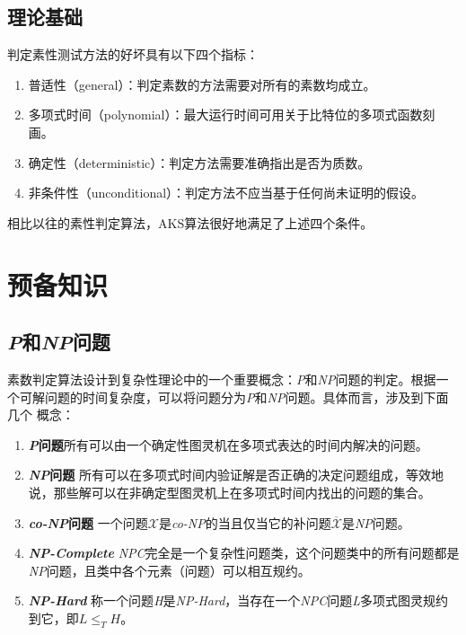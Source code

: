 \documentclass[a4paper]{article}
\numberwithin{equation}{section}
\begin{document}
\begin{multicols}{2}
  \subsection{理论基础}
  判定素性测试方法的好坏具有以下四个指标：
  \begin{enumerate}
    \item 普适性（general）：判定素数的方法需要对所有的素数均成立。
    \item 多项式时间（polynomial）：最大运行时间可用关于比特位的多项式函数刻画。
    \item 确定性（deterministic）：判定方法需要准确指出是否为质数。
    \item 非条件性（unconditional）：判定方法不应当基于任何尚未证明的假设。
  \end{enumerate}

  相比以往的素性判定算法，AKS算法很好地满足了上述四个条件。

  \section{预备知识}    
  \subsection{\textit{P}和\textit{NP}问题}
  素数判定算法设计到复杂性理论中的一个重要概念：\textit{P}和\textit{NP}问题的判定。根据一个可解问题的时间复杂度，可以将问题分为\textit{P}和\textit{NP}问题。具体而言，涉及到下面几个
  概念：
  \begin{enumerate}
    \item \textbf{\textit{P}问题}\quad 所有可以由一个确定性图灵机在多项式表达的时间内解决的问题。
    \item \textbf{\textit{NP}问题}\quad
      所有可以在多项式时间内验证解是否正确的决定问题组成，等效地说，那些解可以在非确定型图灵机上在多项式时间内找出的问题的集合。
    \item \textbf{\textit{co-NP}问题}\quad
      一个问题$\mathcal{X}$是\textit{co-NP}的当且仅当它的补问题$\overline{\mathcal{X}}$是\textit{NP}问题。
    \item \textbf{\textit{NP-Complete}}\quad
      \textit{NPC}完全是一个复杂性问题类，这个问题类中的所有问题都是\textit{NP}问题，且类中各个元素（问题）可以相互规约。
    \item \textbf{\textit{NP-Hard}}\quad
      称一个问题\textit{H}是\textit{NP-Hard}，当存在一个\textit{NPC}问题\textit{L}多项式图灵规约到它，即$L\le _T H$。
  \end{enumerate}


\end{multicols}
\end{document}
